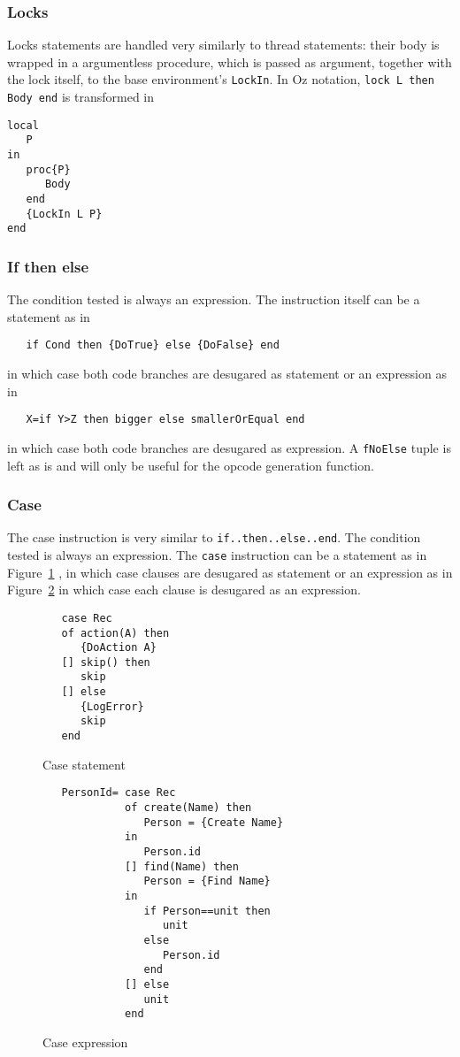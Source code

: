 \documentclass[a4paper]{memoir}
\begin{document}
\subsubsection{Locks}
Locks statements are handled very similarly to thread statements: their body is
wrapped in a argumentless procedure, which is passed as argument, together with
the lock itself, to the base environment's \lstinline!LockIn!. In Oz notation, \lstinline!lock L then Body end! is transformed in
\begin{lstlisting}
local
   P
in
   proc{P}
      Body
   end
   {LockIn L P}
end
\end{lstlisting}


\subsubsection{If then else}
The condition tested is always an expression.
The instruction itself can be a statement as in 
\begin{lstlisting}
   if Cond then {DoTrue} else {DoFalse} end
\end{lstlisting}
in which case both code branches are desugared as statement
or an expression as in
\begin{lstlisting}
   X=if Y>Z then bigger else smallerOrEqual end
\end{lstlisting}
in which case both code branches are desugared as expression.
A \lstinline!fNoElse! tuple is left as is and will only be useful for the opcode generation function.

\subsubsection{Case}
The case instruction is very similar to \lstinline!if..then..else..end!.
The condition tested is always an expression.
The \lstinline!case! instruction can be a statement as in Figure~\ref{fig:casestat}
, in which case clauses are desugared as statement or an expression as in Figure~\ref{fig:caseexpr}
in which case each clause is desugared as an expression.
\begin{figure}[h]
\begin{lstlisting}
   case Rec
   of action(A) then
      {DoAction A}
   [] skip() then
      skip
   [] else
      {LogError}
      skip
   end
\end{lstlisting}
\caption{Case statement}
\label{fig:casestat}
\end{figure}

\begin{figure}[h]
\begin{lstlisting}
   PersonId= case Rec
             of create(Name) then
                Person = {Create Name}
             in
                Person.id
             [] find(Name) then
                Person = {Find Name}
             in
                if Person==unit then
                   unit
                else
                   Person.id
                end
             [] else
                unit
             end
\end{lstlisting}
\caption{Case expression}
\label{fig:caseexpr}
\end{figure}
\end{document}

